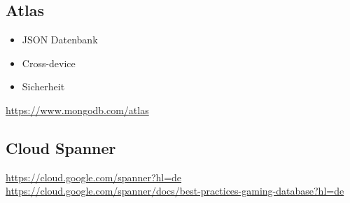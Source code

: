\subsection{Atlas}

\begin{itemize}
    \item JSON Datenbank
    \item Cross-device
    \item Sicherheit
\end{itemize}

\url{https://www.mongodb.com/atlas}


\subsection{Cloud Spanner}

\url{https://cloud.google.com/spanner?hl=de}\\
\url{https://cloud.google.com/spanner/docs/best-practices-gaming-database?hl=de}